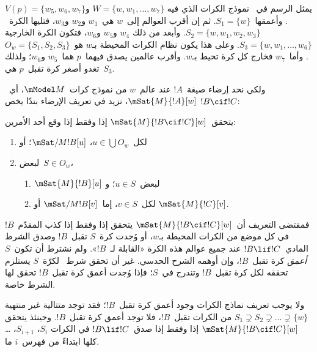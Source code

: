 \documentclass[../../../include/open-logic-section]{subfiles}
\begin{document}
يمثل الرسم في~ نموذج الكرات الذي فيه
$W = \{w, w_1, \dots, w_7\}$ و$V(p) = \{w_5, w_6, w_7\}$.
وأعمقها~$S_1 = \{w\}$. ثم إن أقرب العوالم إلى~$w$ هي~$w_1$ و$w_2$
و$w_3$، فتليها الكرة~$S_2 = \{w, w_1, w_2, w_3\}$. وأبعد من ذلك
$w_4$ و$w_5$ و$w_6$، فتكون الكرة الخارجية
$S_3 = \{w, w_1, \dots, w_6\}$. وعلى هذا يكون نظام الكرات المحيطة
بـ$w$ هو~$O_w = \{S_1, S_2, S_3\}$. وأما~$w_7$ فخارج كل كرة تحيط
بـ$w$. وأقرب عالمين يصدق فيهما~$p$ هما~$w_5$ و$w_6$؛ ولذلك تغدو
أصغر كرة تقبل~$p$ هي~$S_3$.

ولكي نحد إرضاء صيغة~$!A$ عند عالم~$w$ من نموذج كرات~$\mModel M$،
أي~$\mSat{M}{!A}[w]$، نزيد في تعريف الإرضاء بندًا يخص
$!B \cif !C$:

\begin{defn}
  يتحقق~$\mSat{M}{!B \cif !C}[w]$ إذا وفقط إذا وقع أحد الأمرين:
  \begin{enumerate}
  \item{} لكل~$u \in \bigcup O_w$،
    $\mSat/{M}{!B}[u]$؛ أو
  \item{} لبعض~$S \in O_w$،
    \begin{enumerate}
      \item $\mSat{M}{!B}[u]$ لبعض~$u \in S$؛ و
      \item لكل~$v \in S$، إما~$\mSat/{M}{!B}[v]$ أو
        $\mSat{M}{!C}[v]$.
    \end{enumerate}
  \end{enumerate}
\end{defn}

فمقتضى التعريف أن~$\mSat{M}{!B \cif !C}[w]$ يتحقق إذا وفقط إذا كذب
المقدّم~$!B$ في كل موضع من الكرات المحيطة بـ$w$، أو وُجدت كرة~$S$
تقبل~$!B$ وصدق الشرط المادي~$!B \lif !C$ عند جميع عوالم هذه الكرة
«القابلة لـ~$!B$». ولم نشترط أن تكون~$S$ \emph{أعمق} كرة تقبل~$!B$،
وإن أوهمه الشرح الحدسي. غير أن تحقق شرط~ لكرّة~$S$
يستلزم تحققه لكل كرة تقبل~$!B$ وتندرج في~$S$؛ فإذا وُجدت أعمق كرة
تقبل~$!B$ تحقق لها الشرط خاصة.

ولا يوجب تعريف نماذج الكرات وجود أعمق كرة تقبل~$!B$؛ فقد توجد متتالية
غير منتهية
$S_1 \supsetneq S_2 \supsetneq \dots \supsetneq \{w\}$ من الكرات
تقبل~$!B$، فلا توجد أعمق كرة تقبل~$!B$. وحينئذ يتحقق
$\mSat{M}{!B \cif !C}[w]$ إذا وفقط إذا صدق~$!B \lif !C$ في الكرات
$S_i$، $S_{i+1}$، \dots{} كلها ابتداءً من فهرس~$i$ ما.
\end{document}
